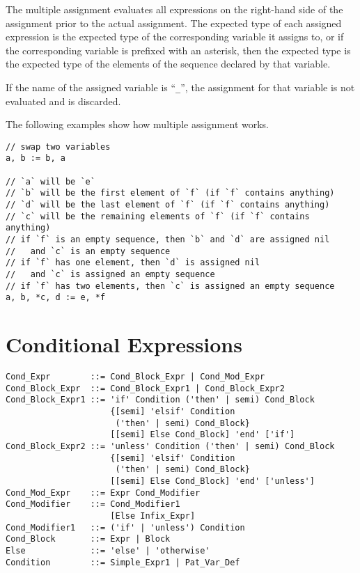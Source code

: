 The multiple assignment evaluates all expressions on the right-hand side of the assignment prior to the actual assignment. The expected type of each assigned expression is the expected type of the corresponding variable it assigns to, or if the corresponding variable is prefixed with an asterisk, then the expected type is the expected type of the elements of the sequence declared by that variable. 

If the name of the assigned variable is ``\lstinline!_!'', the assignment for that variable is not evaluated and is discarded. 

\example The following examples show how multiple assignment works. 
\begin{lstlisting}
// swap two variables
a, b := b, a

// `a` will be `e`
// `b` will be the first element of `f` (if `f` contains anything)
// `d` will be the last element of `f` (if `f` contains anything)
// `c` will be the remaining elements of `f` (if `f` contains anything)
// if `f` is an empty sequence, then `b` and `d` are assigned nil
//   and `c` is an empty sequence
// if `f` has one element, then `d` is assigned nil 
//   and `c` is assigned an empty sequence
// if `f` has two elements, then `c` is assigned an empty sequence
a, b, *c, d := e, *f
\end{lstlisting}





\section{Conditional Expressions}
\label{sec:conditional-expressions}

\syntax\begin{lstlisting}
Cond_Expr        ::= Cond_Block_Expr | Cond_Mod_Expr
Cond_Block_Expr  ::= Cond_Block_Expr1 | Cond_Block_Expr2
Cond_Block_Expr1 ::= 'if' Condition ('then' | semi) Cond_Block 
                     {[semi] 'elsif' Condition 
                      ('then' | semi) Cond_Block}
                     [[semi] Else Cond_Block] 'end' ['if']
Cond_Block_Expr2 ::= 'unless' Condition ('then' | semi) Cond_Block 
                     {[semi] 'elsif' Condition 
                      ('then' | semi) Cond_Block}
                     [[semi] Else Cond_Block] 'end' ['unless']
Cond_Mod_Expr    ::= Expr Cond_Modifier
Cond_Modifier    ::= Cond_Modifier1
                     [Else Infix_Expr]
Cond_Modifier1   ::= ('if' | 'unless') Condition 
Cond_Block       ::= Expr | Block
Else             ::= 'else' | 'otherwise'
Condition        ::= Simple_Expr1 | Pat_Var_Def
\end{lstlisting}

